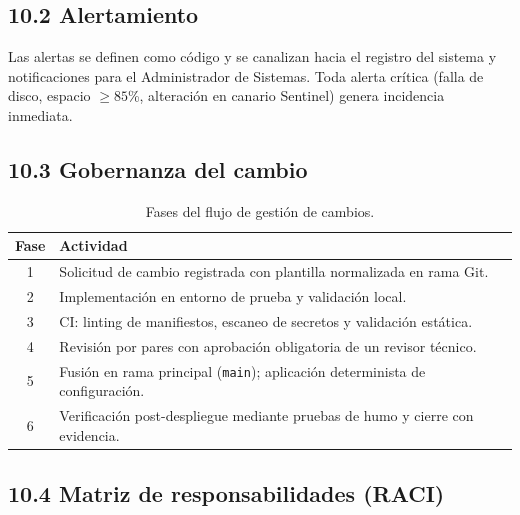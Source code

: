 \documentclass[10pt,a4paper]{article}
\begin{document}
\subsection{10.2 Alertamiento}
Las alertas se definen como código y se canalizan hacia el registro del sistema y notificaciones para el Administrador de Sistemas. Toda alerta crítica (falla de disco, espacio $\ge 85$\%, alteración en canario Sentinel) genera incidencia inmediata.

\subsection{10.3 Gobernanza del cambio}

\begin{table}[htbp]
\centering
\small
\caption{Fases del flujo de gestión de cambios.}
\label{tab:gobernanza}
\begin{tabular}{|c|p{14cm}|}
\hline
\textbf{\textsf{Fase}} & \textbf{\textsf{Actividad}} \\
\hline
1 & Solicitud de cambio registrada con plantilla normalizada en rama Git. \\
\hline
2 & Implementación en entorno de prueba y validación local. \\
\hline
3 & CI: linting de manifiestos, escaneo de secretos y validación estática. \\
\hline
4 & Revisión por pares con aprobación obligatoria de un revisor técnico. \\
\hline
5 & Fusión en rama principal (\texttt{main}); aplicación determinista de configuración. \\
\hline
6 & Verificación post-despliegue mediante pruebas de humo y cierre con evidencia. \\
\hline
\end{tabular}
\end{table}

\subsection{10.4 Matriz de responsabilidades (RACI)}
\end{document}
